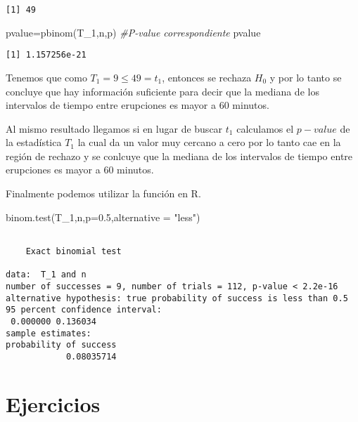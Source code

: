 \documentclass[
  a4paper,
  oneside,
  openany]{book}
\newenvironment{Shaded}{\begin{snugshade}}{\end{snugshade}}
\newcommand{\AttributeTok}[1]{\textcolor[rgb]{0.77,0.63,0.00}{#1}}
\newcommand{\CommentTok}[1]{\textcolor[rgb]{0.56,0.35,0.01}{\textit{#1}}}
\newcommand{\FloatTok}[1]{\textcolor[rgb]{0.00,0.00,0.81}{#1}}
\newcommand{\FunctionTok}[1]{\textcolor[rgb]{0.00,0.00,0.00}{#1}}
\newcommand{\NormalTok}[1]{#1}
\newcommand{\OtherTok}[1]{\textcolor[rgb]{0.56,0.35,0.01}{#1}}
\newcommand{\StringTok}[1]{\textcolor[rgb]{0.31,0.60,0.02}{#1}}
\begin{document}
\begin{verbatim}
[1] 49
\end{verbatim}

\begin{Shaded}
\begin{Highlighting}[]
\NormalTok{pvalue}\OtherTok{=}\FunctionTok{pbinom}\NormalTok{(T\_1,n,p)     }\CommentTok{\#P{-}value correspondiente}
\NormalTok{pvalue}
\end{Highlighting}
\end{Shaded}

\begin{verbatim}
[1] 1.157256e-21
\end{verbatim}

Tenemos que como \(T_1=9\leq 49 =t_1\), entonces se rechaza \(H_0\) y por lo tanto se concluye que hay información suficiente para decir que la mediana de los intervalos de tiempo entre erupciones es mayor a 60 minutos.

Al mismo resultado llegamos si en lugar de buscar \(t_1\) calculamos el \(p-value\) de la estadística \(T_1\) la cual da un valor muy cercano a cero por lo tanto cae en la región de rechazo y se conlcuye que la mediana de los intervalos de tiempo entre erupciones es mayor a 60 minutos.

Finalmente podemos utilizar la función en R.

\begin{Shaded}
\begin{Highlighting}[]
\FunctionTok{binom.test}\NormalTok{(T\_1,n,}\AttributeTok{p=}\FloatTok{0.5}\NormalTok{,}\AttributeTok{alternative =} \StringTok{"less"}\NormalTok{)}
\end{Highlighting}
\end{Shaded}

\begin{verbatim}

    Exact binomial test

data:  T_1 and n
number of successes = 9, number of trials = 112, p-value < 2.2e-16
alternative hypothesis: true probability of success is less than 0.5
95 percent confidence interval:
 0.000000 0.136034
sample estimates:
probability of success 
            0.08035714 
\end{verbatim}

\hypertarget{ejercicios-1}{%
\section{Ejercicios}\label{ejercicios-1}}
\end{document}

